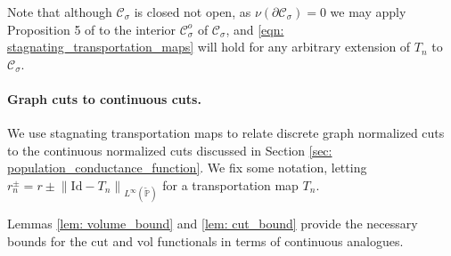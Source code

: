 \documentclass{article}
\newcommand{\vol}{\mathrm{vol}}
\newcommand{\cut}{\mathrm{cut}}
\newcommand{\norm}[1]{\left\lVert#1\right\rVert}
\newcommand{\1}{\mathbf{1}}
\newcommand{\Pbb}{\mathbb{P}}
\newcommand{\Cset}{\mathcal{C}}
\newcommand{\Csig}{\Cset_{\sigma}}
\theoremstyle{aldenthm}
\theoremstyle{aldenrmrk}
\begin{document}

Note that although $\Csig$ is closed not open, as $\nu(\partial \Csig) = 0$ we may apply Proposition 5 of \cite{garciatrillos16} to the interior $\Csig^o$ of $\Csig$, and \eqref{eqn: stagnating_transportation_maps} will hold for any arbitrary extension of $T_n$ to $\Csig$.

\paragraph{Graph cuts to continuous cuts.}

We use stagnating transportation maps to relate discrete graph normalized cuts to the continuous normalized cuts discussed in Section \ref{sec: population_conductance_function}. We fix some notation, letting $r_n^{\pm} = r \pm \norm{\mathrm{Id} - T_n}_{L^{\infty}(\widetilde{\Pbb})}$ for a transportation map $T_n$.

Lemmas \ref{lem: volume_bound} and \ref{lem: cut_bound} provide the necessary bounds for the $\cut$ and $\vol$ functionals in terms of continuous analogues.
\end{document}
